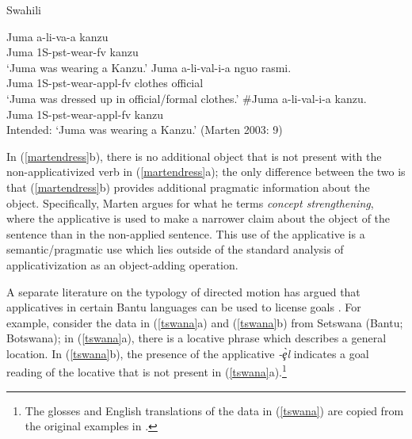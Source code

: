 \documentclass[output=paper]{langsci/langscibook}
\begin{document}
\begin{exe}
\ex\label{martendress}Swahili \begin{xlist}
	\ex \gll Juma a-li-va-a kanzu\\
Juma 1S-{\sc pst}-wear-{\sc fv} kanzu\\
	\glt `Juma was wearing a Kanzu.'
	\ex\gll Juma a-li-val-i-a nguo rasmi.\\
Juma {\sc 1S-pst}-wear-{\sc appl-fv} clothes official\\
	\glt `Juma was dressed up in official/formal clothes.'
	\ex\gll \#Juma a-li-val-i-a kanzu.\\
Juma {\sc 1S-pst}-wear-{\sc appl-fv} kanzu\\
	\glt Intended: `Juma was wearing a Kanzu.' (Marten 2003: 9) %
	\end{xlist}
\end{exe}
%
In (\ref{martendress}b), there is no additional object that is not present with the non-applicativized verb in (\ref{martendress}a); the only difference between the two is that (\ref{martendress}b) provides additional pragmatic information about the object. Specifically, Marten argues for what he terms \emph{concept strengthening}, where the applicative is used to make a narrower claim about the object of the sentence than in the non-applied sentence. This use of the applicative is a semantic/pragmatic use which lies outside of the standard analysis of applicativization as an object-adding operation. 

A separate literature on the typology of directed motion has argued that applicatives in certain Bantu languages can be used to license {\sc goals} \citep{schaefer:1985,sitoe:1996}. For example, consider the data in (\ref{tswana}a) and (\ref{tswana}b) from Setswana (Bantu; Botswana); in (\ref{tswana}a), there is a locative phrase which describes a general location. In (\ref{tswana}b), the presence of the applicative \emph{-\c{\`e}l} indicates a {\sc goal}  reading of the locative that is not present in (\ref{tswana}a).\footnote{The glosses and English translations of the data in (\ref{tswana}) are copied from the original examples in \citet{schaefer:1985}.}
\end{document}
